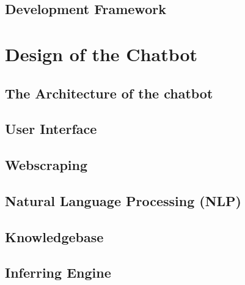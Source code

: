 \documentclass[11pt]{article}
\begin{document}



 
\subsection{Development Framework} \label{development-framework}


\section{Design of the Chatbot} \label{design}

 
\subsection{The Architecture of the chatbot} \label{architecture}

\subsection{User Interface} \label{user-interface}

\subsection{Webscraping} \label{webscraping}

\subsection{Natural Language Processing (NLP)} \label{nlp}

\subsection{Knowledgebase} \label{knowledgebase}

% 
\subsection{Inferring Engine} \label{inference-engine}
\end{document}
